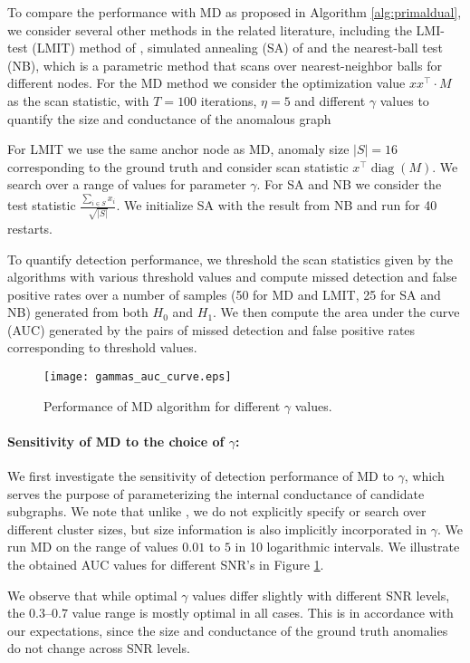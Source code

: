 \documentclass{article}
\DeclareMathOperator{\diag}{diag}
\begin{document}
To compare the performance with MD as proposed in Algorithm \ref{alg:primaldual}, we consider several other methods in the related literature, including the LMI-test (LMIT) method of \cite{nips14}, simulated annealing (SA) of \cite{duczmal} and the nearest-ball test (NB), which is a parametric method that scans over nearest-neighbor balls for different nodes. For the MD method we consider the optimization value $x x^\top \cdot M$ as the scan statistic, with $T = 100$ iterations, $\eta = 5$ and different $\gamma$ values to quantify the size and conductance of the anomalous graph 

For LMIT we use the same anchor node as MD, anomaly size $|S| = 16$ corresponding to the ground truth and consider scan statistic $x^\top \diag(M)$. We search over a range of values for parameter $\gamma$. For SA and NB we consider the test statistic $\frac{\sum_{i \in S} x_i}{\sqrt{|S|}}$. We initialize SA with the result from NB and run for 40 restarts. 

To quantify detection performance, we threshold the scan statistics given by the algorithms with various threshold values and compute missed detection and false positive rates over a number of samples (50 for MD and LMIT, 25 for SA and NB) generated from both $H_0$ and $H_1$. We then compute the area under the curve (AUC) generated by the pairs of missed detection and false positive rates corresponding to threshold values.

\begin{figure}[ht]
  \centering
  \texttt{[image: gammas\_auc\_curve.eps]}
  \caption{Performance of MD algorithm for different $\gamma$ values.}
  \label{fig:gammas}
\end{figure}

\paragraph{Sensitivity of MD to the choice of $\gamma$:} We first investigate the sensitivity of detection performance of MD to $\gamma$, which serves the purpose of parameterizing the internal conductance of candidate subgraphs. We note that unlike \cite{aistats14,nips14}, we do not explicitly specify or search over different cluster sizes, but size information is also implicitly incorporated in $\gamma$. We run MD on the range of values $0.01$ to $5$ in 10 logarithmic intervals. We illustrate the obtained AUC values for different SNR's in Figure \ref{fig:gammas}. 

We observe that while optimal $\gamma$ values differ slightly with different SNR levels, the $0.3$--$0.7$ value range is mostly optimal in all cases. This is in accordance with our expectations, since the size and conductance of the ground truth anomalies do not change across SNR levels.
\end{document}
